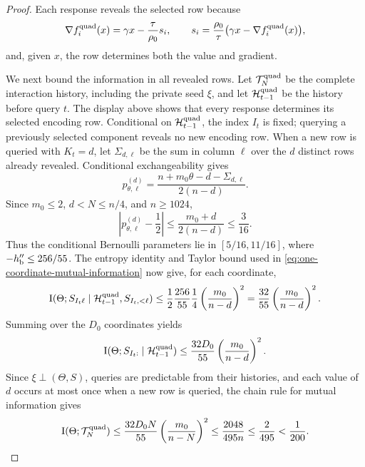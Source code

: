 \documentclass{article}
\theoremstyle{definition}
\begin{document}
\begin{proof}
Each response reveals the selected row because
\begin{equation}
 \nabla f_i^{\rm quad}(x)=\gamma x-\frac\tau{\rho_0}s_i,
 \qquad
 s_i=\frac{\rho_0}\tau
 \bigl(\gamma x-\nabla f_i^{\rm quad}(x)\bigr),
\end{equation}
and, given $x$, the row determines both the value and gradient.

We next bound the information in all revealed rows.  Let
$\mathcal T_N^{\rm quad}$ be the complete interaction history, including the private seed
$\xi$, and let $\mathcal H^{\rm quad}_{t-1}$ be the history before query $t$.
The display above shows that every response determines its selected encoding
row.  Conditional on $\mathcal H^{\rm quad}_{t-1}$, the index $I_t$ is fixed;
querying a previously selected component reveals no new encoding row.  When a
new row is queried with $K_t=d$, let $\Sigma_{d,\ell}$ be the
sum in column $\ell$ over the $d$ distinct rows already revealed.  Conditional
exchangeability gives
\begin{equation}
 p_{\theta,\ell}^{(d)}
 =\frac{n+m_0\theta-d-\Sigma_{d,\ell}}{2(n-d)}.
\end{equation}
Since
$m_0\le2$, $d<N\le n/4$, and $n\ge1024$,
\begin{equation}
 \left|p_{\theta,\ell}^{(d)}-\frac12\right|
 \le\frac{m_0+d}{2(n-d)}
 \le\frac3{16}.
\end{equation}
Thus the conditional Bernoulli parameters lie in $[5/16,11/16]$, where
$-h_{\rm b}''\le256/55$.  The entropy identity and Taylor bound used in
\eqref{eq:one-coordinate-mutual-information} now give, for each coordinate,
\[
 \mathrm I(\Theta;S_{I_t\ell}\mid
   \mathcal H^{\rm quad}_{t-1},S_{I_t,<\ell})
 \le \frac12\frac{256}{55}\frac14
       \left(\frac{m_0}{n-d}\right)^2
 =\frac{32}{55}\left(\frac{m_0}{n-d}\right)^2.
\]
Summing over the $D_0$ coordinates yields
\begin{equation}
 \mathrm I(\Theta;S_{I_t:}\mid\mathcal H^{\rm quad}_{t-1})
 \le\frac{32D_0}{55}\left(\frac{m_0}{n-d}\right)^2.
\end{equation}
Since $\xi\perp(\Theta,S)$, queries are predictable from their histories, and
each value of $d$ occurs at most once when a new row is queried, the
chain rule for mutual information gives
\begin{equation}
 \mathrm I(\Theta;\mathcal T_N^{\rm quad})
 \le\frac{32D_0N}{55}
       \left(\frac{m_0}{n-N}\right)^2
 \le\frac{2048}{495n}
 \le\frac2{495}<\frac1{200}.
 \label{eq:low-bias-quadratic-information}
\end{equation}


\end{proof}
\end{document}

